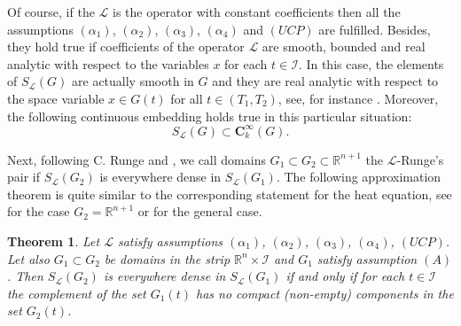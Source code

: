 \documentclass{amsart}
\newtheorem{thm}{Theorem}[section]
\theoremstyle{definition}
\theoremstyle{remark}
\numberwithin{equation}{section}
\begin{document}
Of course, if the ${\mathcal L}$ is the operator with constant coefficients then all the 
assumptions $(\alpha_1)$,   $(\alpha_2)$,  $(\alpha_3)$,  $(\alpha_4)$ and $(UCP)$ are 
fulfilled.  Besides, they hold true if  coefficients of the operator $\mathcal L$ are smooth, 
bounded and real analytic with respect to the variables $x$ for each $t\in \mathcal{I}$. In 
this case, the elements of $S_{\mathcal L}(G) $ are actually smooth in $G$ and they are real 
analytic with respect to the space variable $x\in G(t)$ for all $t \in (T_1,T_2)$, see, for 
instance \cite{eid}. Moreover, the following continuous embedding 
holds true in this particular situation:
$$
S _{\mathcal L}(G) \subset \mathbf{C}^{\infty} _k (G).
$$
  
Next, following C. Runge \cite{R1885} and \cite{D80}, we call domains 
$G_1 \subset G_2 \subset {\mathbb R}^{n+1}$ the ${\mathcal L}$-Runge's pair 
 if $S_{\mathcal L}(G_2)$ is everywhere dense in $S_{\mathcal L}(G_1)$. 
The following approximation theorem is quite similar to the corresponding statement 
for the heat equation, see \cite{J} for the case $G_2 = {\mathbb R}^{n+1}$ 
or \cite{D80} for the general case.  

\begin{thm} \label{t.dense.uniform}
Let ${\mathcal L}$ satisfy assumptions $(\alpha_1)$, $(\alpha_2)$, $(\alpha_3)$, 
$(\alpha_4)$, $(UCP)$. Let  also $G_1 \subset G_2 $   be domains 
in the strip ${\mathbb R}^n \times {\mathcal I}$ and $G_1$ 
satisfy assumption $(A)$. Then $S_{\mathcal L}(G_2)$ is everywhere dense in 
$S_{\mathcal L}(G_1)$ if and only if for each $t \in {\mathcal I}$ the complement of the 
set  $G_1 (t) $ has no compact (non-empty) components in the set $G_2 (t)$. 
\end{thm}
\end{document}
